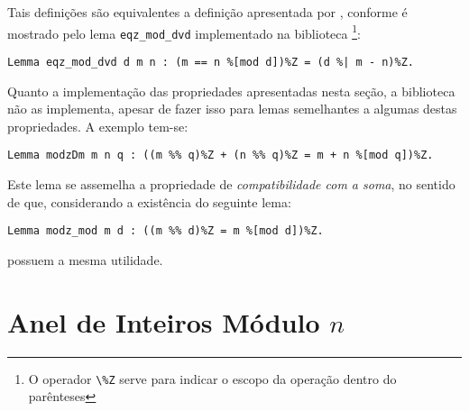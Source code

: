Tais definições são equivalentes a definição apresentada por \cite{book:2399854}, conforme é mostrado pelo lema \lstinline[language = coq]{eqz_mod_dvd} implementado na biblioteca \footnote{O operador 
\lstinline[language = coq]{\%Z} serve para indicar o escopo da operação dentro do parênteses}:
\begin{lstlisting}[language = coq]
    Lemma eqz_mod_dvd d m n : (m == n %[mod d])%Z = (d %| m - n)%Z.
\end{lstlisting}

Quanto a implementação das propriedades apresentadas nesta seção, a biblioteca não as implementa, apesar de fazer isso para lemas semelhantes a algumas destas propriedades. A exemplo tem-se:
\begin{lstlisting}[language = coq]
    Lemma modzDm m n q : ((m %% q)%Z + (n %% q)%Z = m + n %[mod q])%Z.
\end{lstlisting}
Este lema se assemelha a propriedade de \textit{compatibilidade com a soma}, no sentido de que, considerando a existência do seguinte lema:
\begin{lstlisting}[language = coq]
    Lemma modz_mod m d : ((m %% d)%Z = m %[mod d])%Z.
\end{lstlisting}
possuem a mesma utilidade. 


\section{Anel de Inteiros Módulo $n$}

